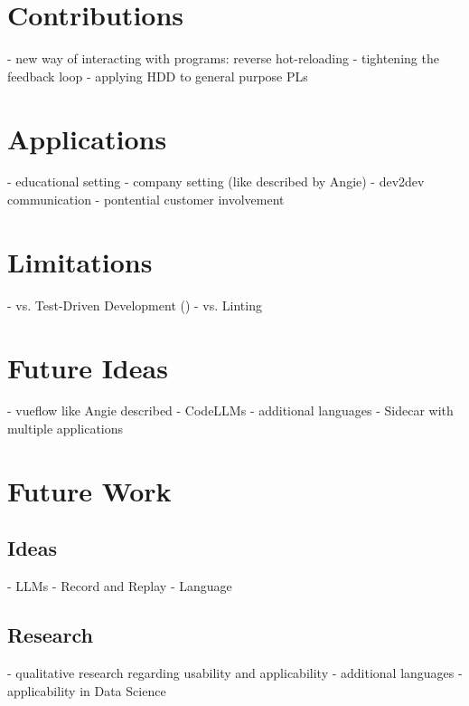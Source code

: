 \documentclass[master,english,smartquotes]{hgbthesis}
\begin{document}
\section{Contributions}
- new way of interacting with programs: reverse hot-reloading
- tightening the feedback loop
- applying HDD to general purpose PLs
\section{Applications}
- educational setting
- company setting (like described by Angie)
- dev2dev communication
- pontential customer involvement
\section{Limitations}
- vs. Test-Driven Development ()
- vs. Linting
\section{Future Ideas}
- vueflow like Angie described
- CodeLLMs
- additional languages
- Sidecar with multiple applications
\section{Future Work}
\subsection{Ideas}
- LLMs
- Record and Replay
- Language
\subsection{Research}
- qualitative research regarding usability and applicability
- additional languages
- applicability in Data Science

%
%
%
%
%
%
%

\appendix                                                             %

\end{document}
